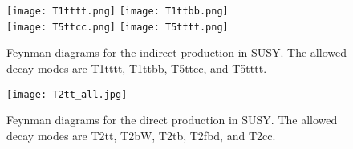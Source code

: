 \begin{figure}[!htb]
	\begin{center}
		\texttt{[image: T1tttt.png]}
		\texttt{[image: T1ttbb.png]} \\
		\texttt{[image: T5ttcc.png]}
		\texttt{[image: T5tttt.png]} \\
	\end{center}
	\caption[Gluino mediated stop production]{Feynman diagrams for the indirect \st{} production in SUSY. The allowed decay modes are T1tttt, T1ttbb, T5ttcc, and T5tttt.
	}
	\label{fig:stop-gluino-production}
\end{figure}

\begin{figure}[!htb]
	\begin{center}
		\texttt{[image: T2tt\_all.jpg]}
	\end{center}
	\caption[Direct stop production]{Feynman diagrams for the direct \st{} production in SUSY. The allowed decay modes are T2tt, T2bW, T2tb, T2fbd, and T2cc. }
	\label{fig:stop-direct-production}
\end{figure}